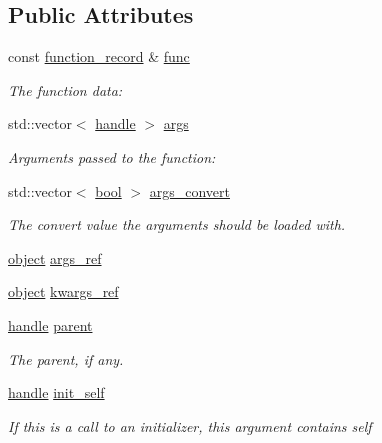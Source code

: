 \subsection*{Public Attributes}
\begin{DoxyCompactItemize}
\item 
const \mbox{\hyperlink{structfunction__record}{function\+\_\+record}} \& \mbox{\hyperlink{structfunction__call_afadf98c8478fd2c1958003cedefa38d7}{func}}
\begin{DoxyCompactList}\small\item\em The function data\+: \end{DoxyCompactList}\item 
std\+::vector$<$ \mbox{\hyperlink{classhandle}{handle}} $>$ \mbox{\hyperlink{structfunction__call_ae77a8a65a8ae5ebbbd2eb17bc9ff54d3}{args}}
\begin{DoxyCompactList}\small\item\em Arguments passed to the function\+: \end{DoxyCompactList}\item 
std\+::vector$<$ \mbox{\hyperlink{asdl_8h_af6a258d8f3ee5206d682d799316314b1}{bool}} $>$ \mbox{\hyperlink{structfunction__call_aef756a1f9206af0d2e3fdb684b2d6b5f}{args\+\_\+convert}}
\begin{DoxyCompactList}\small\item\em The {\ttfamily convert} value the arguments should be loaded with. \end{DoxyCompactList}\item 
\mbox{\hyperlink{classobject}{object}} \mbox{\hyperlink{structfunction__call_a13ff878b84d1c7a41c0f28c62db36925}{args\+\_\+ref}}
\item 
\mbox{\hyperlink{classobject}{object}} \mbox{\hyperlink{structfunction__call_a1ae7a6c18887e3c791b6cb16b2cc98c0}{kwargs\+\_\+ref}}
\item 
\mbox{\hyperlink{classhandle}{handle}} \mbox{\hyperlink{structfunction__call_a72923821447a70a799f862a501eee20d}{parent}}
\begin{DoxyCompactList}\small\item\em The parent, if any. \end{DoxyCompactList}\item 
\mbox{\hyperlink{classhandle}{handle}} \mbox{\hyperlink{structfunction__call_a8f9e4659cf3ca4be507d2220420b9c00}{init\+\_\+self}}
\begin{DoxyCompactList}\small\item\em If this is a call to an initializer, this argument contains {\ttfamily self} \end{DoxyCompactList}\end{DoxyCompactItemize}


